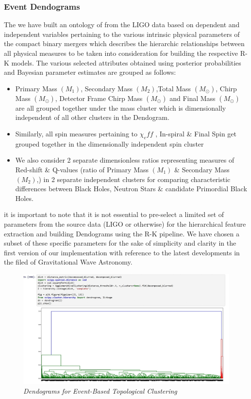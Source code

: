     \subsubsection{Event Dendograms}

    The we have built an ontology of from the LIGO data based on dependent and independent variables pertaining to the various intrinsic physical parameters of the compact binary mergers which describes the hierarchic relationships between all physical measures to be taken into consideration for building the respective R-K models. The various selected attributes obtained using posterior probabilities and Bayesian parameter estimates are grouped as follows:
   
   \begin{itemize}
   	\item Primary Mass $(M_1)$, Secondary Mass $(M_2)$,Total Mass $(M_\odot)$, Chirp Mass $(M_\odot)$, Detector Frame Chirp Mass $(M_\odot)$ and Final Mass $(M_\odot)$ are all grouped together under the mass cluster which is dimensionally independent of all other clusters in the Dendogram. 
   	\item Similarly, all spin measures pertaining to $\chi_eff $ , In-spiral \& Final Spin get grouped together in the dimensionally independent spin cluster
   	\item We also consider 2 separate dimensionless ratios representing measures of Red-shift \& Q-values (ratio of Primary Mass $(M_1)$ \& Secondary Mass $(M_2)$,) in 2 separate independent clusters for comparing characteristic differences between Black Holes, Neutron Stars \& candidate Primordial Black Holes.
   \end{itemize}  
   
   it is important to note that it is not essential to pre-select a limited set of parameters from the source data (LIGO or otherwise) for the hierarchical feature extraction and building Dendograms using the R-K pipeline. We have chosen a subset of these specific parameters for the sake of simplicity and clarity in the first version of our implementation with reference to the latest developments in the filed of Gravitational Wave Astronomy.
   
   \begin{figure}[H]
   	\centering
   	\includegraphics[width=1.0\linewidth]{images/56_12_Dendograms for Event Based Custering.jpg}
   	\caption{\textit{Dendograms for Event-Based Topological Clustering }}
   	\label{fig:LIGO7_PlaceHolder_fig}
   \end{figure}
   
